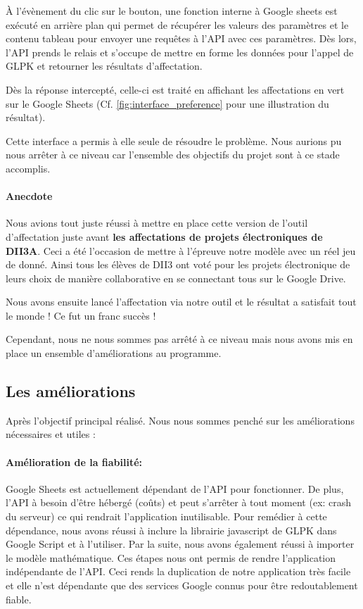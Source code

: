\documentclass[final,poster]{polytech/polytech}
\begin{document}
À l'évènement du clic sur le bouton, une fonction interne à Google sheets est exécuté en arrière plan qui permet de récupérer les valeurs des paramètres et le contenu tableau pour envoyer une requêtes à l’API avec ces paramètres.
Dès lors, l'API prends le relais et s'occupe de mettre en forme les données pour l'appel de GLPK et retourner les résultats d'affectation.

Dès la réponse intercepté, celle-ci est traité en affichant les affectations en vert sur le Google Sheets (Cf. \autoref{fig:interface_preference} pour une illustration du résultat). 

Cette interface a permis à elle seule de résoudre le problème. Nous aurions pu nous arrêter à ce niveau car l'ensemble des objectifs du projet sont à ce stade accomplis.


\paragraph{Anecdote}
\label{anec:affect_proj_elec}
Nous avions tout juste réussi à mettre en place cette version de l'outil d'affectation juste avant \textbf{les affectations de projets électroniques de DII3A}. Ceci a été l'occasion de mettre à l'épreuve notre modèle avec un réel jeu de donné. 
Ainsi tous les élèves de DII3 ont voté pour les projets électronique de leurs choix de manière collaborative en se connectant tous sur le Google Drive. 

Nous avons ensuite lancé l'affectation via notre outil et le résultat a satisfait tout le monde ! Ce fut un franc succès ! 

Cependant, nous ne nous sommes pas arrêté à ce niveau mais nous avons mis en place un ensemble d'améliorations au programme.

\subsection{Les améliorations}

Après l'objectif principal réalisé. Nous nous sommes penché sur les améliorations nécessaires et utiles :

\paragraph{Amélioration de la fiabilité:}
Google Sheets est actuellement dépendant de l’API pour fonctionner. De plus, l’API à besoin d'être hébergé (coûts) et peut s'arrêter à tout moment (ex: crash du serveur) ce qui rendrait l'application inutilisable. Pour remédier à cette dépendance, nous avons réussi à inclure la librairie javascript de GLPK dans Google Script et à l'utiliser. Par la suite, nous avons également réussi à importer le modèle mathématique.
Ces étapes nous ont permis de rendre l'application indépendante de l’API. Ceci rends la duplication de notre application très facile et elle n'est dépendante que des services Google connus pour être redoutablement fiable.
\end{document}
